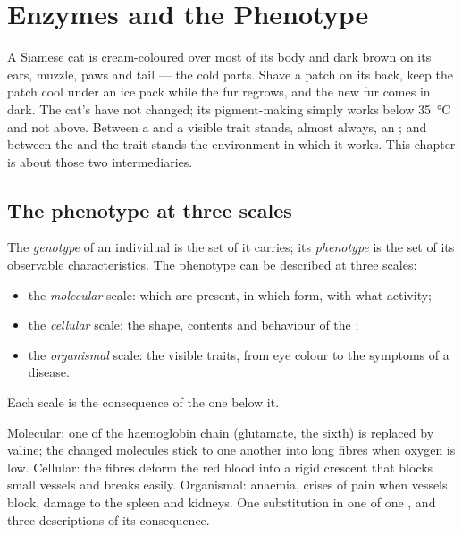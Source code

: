 \chapter{Enzymes and the Phenotype}\label{ch:g11:enzymes-and-phenotype}

A Siamese cat is cream-coloured over most of its body and dark brown on
its ears, muzzle, paws and tail --- the cold parts. Shave a patch on its
back, keep the patch cool under an ice pack while the fur regrows, and
the new fur comes in dark. The cat's  have not changed; its
pigment-making  simply works below \qty{35}{\celsius} and not
above. Between a  and a visible trait stands, almost always, an
; and between the  and the trait stands the environment
in which it works. This chapter is about those two intermediaries.

\section{The phenotype at three scales}

\begin{definition}\label{def:g11:enzymes-and-phenotype:phenotype}
The \emph{genotype} of an individual is the set of
 it carries; its \emph{phenotype} is the set
of its observable characteristics. The phenotype can be described at
three scales:
\begin{itemize}
  \item the \emph{molecular} scale: which  are present, in
        which form, with what activity;
  \item the \emph{cellular} scale: the shape, contents and behaviour
        of the ;
  \item the \emph{organismal} scale: the visible traits, from eye
        colour to the symptoms of a disease.
\end{itemize}
Each scale is the consequence of the one below it.
\end{definition}

\begin{example}\label{ex:g11:enzymes-and-phenotype:sickle}
Molecular: one  of the haemoglobin chain (glutamate, the
sixth) is replaced by valine; the changed molecules stick to one
another into long fibres when oxygen is low. Cellular: the fibres
deform the red blood  into a rigid crescent that blocks small
vessels and breaks easily. Organismal: anaemia, crises of pain when
vessels block, damage to the spleen and kidneys. One substitution in
one  of one , and three descriptions of its consequence.
\end{example}

